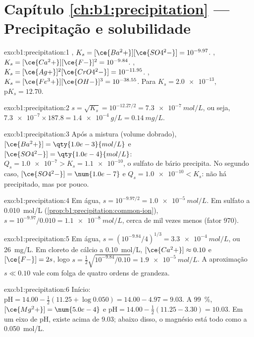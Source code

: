 \section*{Capítulo \ref{ch:b1:precipitation} --- Precipitação e solubilidade}

\begin{solution}{exo:b1:precipitation:1}
, $K_s = [\ce{Ba^2+}][\ce{SO4^2-}] =
10^{-9.97}$. , $K_s = [\ce{Ca^2+}][\ce{F-}]^2 =
10^{-9.84}$. , $K_s =
[\ce{Ag+}]^2[\ce{CrO4^2-}] = 10^{-11.95}$. ,
$K_s = [\ce{Fe^3+}][\ce{OH-}]^3 = 10^{-38.55}$. Para $K_s = \num{2.0e-13}$,
$\mathrm{p}K_s = 12.70$.
\end{solution}

\begin{solution}{exo:b1:precipitation:2}
$s = \sqrt{K_s} = 10^{-12.27/2} = \qty{7.3e-7}{mol/L}$, ou seja,
$\num{7.3e-7} \times 187.8 = \qty{1.4e-4}{g/L} = \qty{0.14}{mg/L}$.
\end{solution}

\begin{solution}{exo:b1:precipitation:3}
Após a mistura (volume dobrado), $[\ce{Ba^2+}] = \qty{1.0e-3}{mol/L}$ e
$[\ce{SO4^2-}] = \qty{1.0e-4}{mol/L}$: $Q_s = \num{1.0e-7} > K_s =
\num{1.1e-10}$, o sulfato de bário precipita. No segundo caso,
$[\ce{SO4^2-}] = \num{1.0e-7}$ e $Q_s = \num{1.0e-10} < K_s$: não há
precipitado, mas por pouco.
\end{solution}

\begin{solution}{exo:b1:precipitation:4}
Em água, $s = 10^{-9.97/2} = \qty{1.0e-5}{mol/L}$. Em sulfato a
\qty{0.010}{mol/L} (\cref{prop:b1:precipitation:common-ion}), $s = 10^{-9.97}/0.010 =
\qty{1.1e-8}{mol/L}$, cerca de mil vezes menos (fator 970).
\end{solution}

\begin{solution}{exo:b1:precipitation:5}
Em água, $s = (10^{-9.84}/4)^{1/3} = \qty{3.3e-4}{mol/L}$, ou
\qty{26}{mg/L}. Em cloreto de cálcio a \qty{0.10}{mol/L},
$[\ce{Ca^2+}] \approx 0.10$ e $[\ce{F-}] = 2s$, logo
$s = \frac12\sqrt{10^{-9.84}/0.10} = \qty{1.9e-5}{mol/L}$. A
aproximação $s \ll 0.10$ vale com folga de quatro ordens de grandeza.
\end{solution}

\begin{solution}{exo:b1:precipitation:6}
Início: $\mathrm{pH} = 14.00 - \frac12(11.25 + \log 0.050) = 14.00 - 4.97 =
9.03$. A \qty{99}{\percent}, $[\ce{Mg^2+}] = \num{5.0e-4}$ e
$\mathrm{pH} = 14.00 - \frac12(11.25 - 3.30) = 10.03$. Em um eixo de pH,
 existe acima de 9.03; abaixo disso, o magnésio está todo
como  a \qty{0.050}{mol/L}.
\end{solution}

